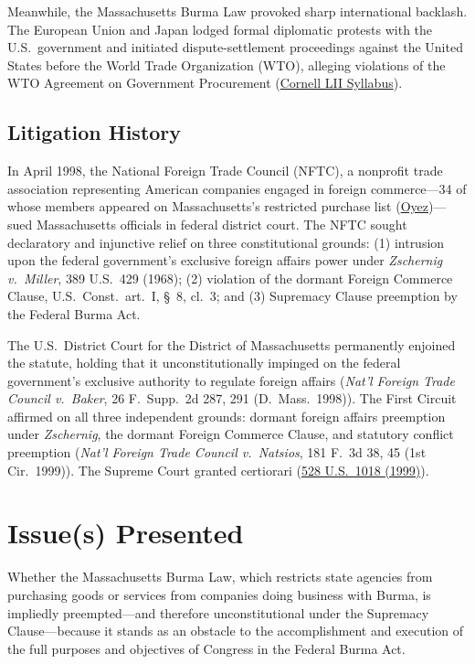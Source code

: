 \documentclass[12pt]{article}
\begin{document}
Meanwhile, the Massachusetts Burma Law provoked sharp international backlash. The European Union and Japan lodged formal diplomatic protests with the U.S.\ government and initiated dispute-settlement proceedings against the United States before the World Trade Organization (WTO), alleging violations of the WTO Agreement on Government Procurement (\href{https://www.law.cornell.edu/supct/html/99-474.ZS.html}{Cornell LII Syllabus}).

\subsection{Litigation History}
In April 1998, the National Foreign Trade Council (NFTC), a nonprofit trade association representing American companies engaged in foreign commerce---34 of whose members appeared on Massachusetts's restricted purchase list (\href{https://www.oyez.org/cases/1999/99-474}{Oyez})---sued Massachusetts officials in federal district court. The NFTC sought declaratory and injunctive relief on three constitutional grounds: (1) intrusion upon the federal government's exclusive foreign affairs power under \textit{Zschernig v.\ Miller}, 389 U.S.\ 429 (1968); (2) violation of the dormant Foreign Commerce Clause, U.S.\ Const.\ art.\ I, \S~8, cl.\ 3; and (3) Supremacy Clause preemption by the Federal Burma Act.

The U.S.\ District Court for the District of Massachusetts permanently enjoined the statute, holding that it unconstitutionally impinged on the federal government's exclusive authority to regulate foreign affairs (\textit{Nat'l Foreign Trade Council v.\ Baker}, 26 F.\ Supp.\ 2d 287, 291 (D.\ Mass.\ 1998)). The First Circuit affirmed on all three independent grounds: dormant foreign affairs preemption under \textit{Zschernig}, the dormant Foreign Commerce Clause, and statutory conflict preemption (\textit{Nat'l Foreign Trade Council v.\ Natsios}, 181 F.\ 3d 38, 45 (1st Cir.\ 1999)). The Supreme Court granted certiorari (\href{https://caselaw.findlaw.com/court/us-supreme-court/530/363.html}{528 U.S.\ 1018 (1999)}).

\section{Issue(s) Presented}

Whether the Massachusetts Burma Law, which restricts state agencies from purchasing goods or services from companies doing business with Burma, is impliedly preempted---and therefore unconstitutional under the Supremacy Clause---because it stands as an obstacle to the accomplishment and execution of the full purposes and objectives of Congress in the Federal Burma Act.
\end{document}
